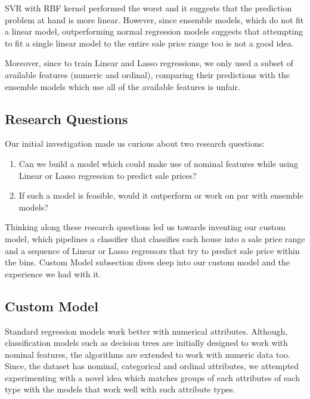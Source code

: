 \documentclass[conference,compsoc]{IEEEtran}
\begin{document}
\par
SVR with RBF kernel performed the worst and it suggests that the prediction problem at hand is more linear. However, since ensemble models, which do not fit a linear model, outperforming normal regression models suggests that attempting to fit a single linear model to the entire sale price range too is not a good idea.

\par
Moreover, since to train Linear and Lasso regressions, we only used a subset of available features (numeric and ordinal), comparing their predictions with the ensemble models which use all of the available features is unfair.

\subsection{Research Questions}
Our initial investigation made us curious about two research questions:

\begin{enumerate}  
\item Can we build a model which could make use of nominal features while using Linear or Lasso regression to predict sale prices?

\item If such a model is feasible, would it outperform or work on par with ensemble models?
\end{enumerate} 
\par
Thinking along these research questions led us towards inventing our custom model, which pipelines a classifier that classifies each house into a sale price range and a sequence of Linear or Lasso regressors that try to predict sale price within the bins. Custom Model subsection dives deep into our custom model and the experience we had with it.


\subsection{Custom Model}


\par
Standard regression models work better with numerical attributes. Although, classification models such as decision trees are initially designed to work with nominal features, the algorithms are extended to work with numeric data too. Since, the dataset has nominal, categorical and ordinal attributes, we attempted experimenting with a novel idea which matches groups of each attributes of each type with the models that work well with such attribute types.
\end{document}
